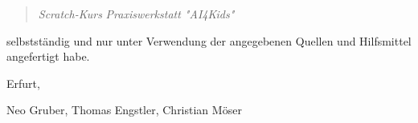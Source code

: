 \documentclass[
		abstract=false,
		appendixprefix=true,		  
		a4paper,                  %
		10pt,                     %
		headings=normal,          %
		chapterprefix=false,      %
		oneside,
		openright,                %
		titlepage,                %
		listof=totoc,             %
		headsepline,              %
		plainheadsepline,         %
		bibliography=totoc,       %
		parskip=half-,						%
		numbers=noenddot					%
	]{scrreprt}                 %
\newcommand{\titel}{Scratch-Kurs}
\newcommand{\untertitel}{Praxiswerkstatt "AI4Kids"}
\newcommand{\autor}{Neo Gruber, Thomas Engstler, Christian Möser}
\newcommand{\ort}{Erfurt}
\begin{document}
\begin{quote}
\textit{\titel} \textit{\untertitel}
\end{quote}

selbstständig und nur unter Verwendung der angegebenen Quellen und Hilfsmittel angefertigt habe.

\begin{flushright}
\ort, \datum 
\end{flushright}
\small{\autor} 

\end{document}
